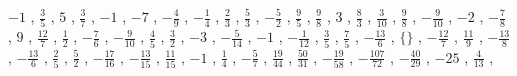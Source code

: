 \documentclass[12pt]{article}
\theoremstyle{aufg}
\theoremstyle{bsp}
\begin{document}
\begin{flushleft}
$ \scriptstyle-1$ , $ \scriptstyle\frac{3}{5}$ , $ \scriptstyle5$ , $ \scriptstyle\frac{3}{7}$ , $ \scriptstyle-1$ , $ \scriptstyle-7$ , $ \scriptstyle- \frac{4}{9}$ , $ \scriptstyle- \frac{1}{4}$ , $ \scriptstyle\frac{2}{3}$ , $ \scriptstyle\frac{5}{3}$ , $ \scriptstyle- \frac{5}{2}$ , $ \scriptstyle\frac{9}{5}$ , $ \scriptstyle\frac{9}{8}$ , $ \scriptstyle3$ , $ \scriptstyle\frac{8}{3}$ , $ \scriptstyle\frac{3}{10}$ , $ \scriptstyle\frac{9}{8}$ , $ \scriptstyle- \frac{9}{10}$ , $ \scriptstyle-2$ , $ \scriptstyle- \frac{7}{8}$ , $ \scriptstyle9$ , $ \scriptstyle\frac{12}{7}$ , $ \scriptstyle\frac{1}{2}$ , $ \scriptstyle- \frac{7}{6}$ , $ \scriptstyle- \frac{9}{10}$ , $ \scriptstyle\frac{4}{5}$ , $ \scriptstyle\frac{3}{2}$ , $ \scriptstyle-3$ , $ \scriptstyle- \frac{5}{14}$ , $ \scriptstyle-1$ , $ \scriptstyle- \frac{1}{12}$ , $ \scriptstyle\frac{3}{5}$ , $ \scriptstyle\frac{7}{5}$ , $ \scriptstyle- \frac{13}{6}$ , $ \scriptstyle\{\}$ , $ \scriptstyle- \frac{12}{7}$ , $ \scriptstyle\frac{11}{9}$ , $ \scriptstyle- \frac{13}{8}$ , $ \scriptstyle- \frac{13}{6}$ , $ \scriptstyle\frac{2}{5}$ , $ \scriptstyle\frac{5}{2}$ , $ \scriptstyle- \frac{17}{16}$ , $ \scriptstyle- \frac{13}{15}$ , $ \scriptstyle\frac{11}{15}$ , $ \scriptstyle-1$ , $ \scriptstyle\frac{1}{4}$ , $ \scriptstyle- \frac{5}{7}$ , $ \scriptstyle\frac{19}{44}$ , $ \scriptstyle\frac{50}{31}$ , $ \scriptstyle- \frac{19}{58}$ , $ \scriptstyle- \frac{107}{72}$ , $ \scriptstyle- \frac{40}{29}$ , $ \scriptstyle-25$ , $ \scriptstyle\frac{4}{13}$ , \end{flushleft} 
    
\end{document}
